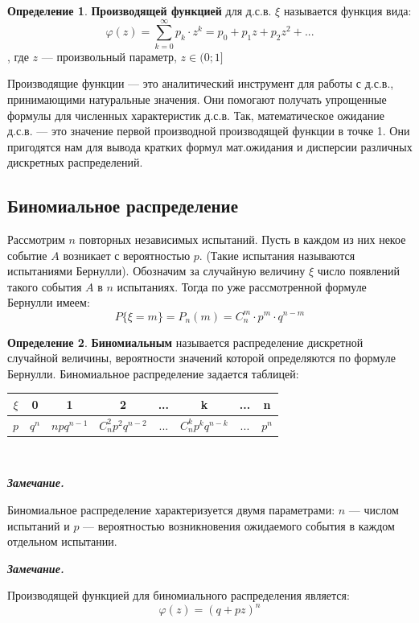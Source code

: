 \documentclass[12pt,a4paper]{article}
\theoremstyle{definition}
\newtheorem{definition}{Определение}[section]
\theoremstyle{definition}
\theoremstyle{remark}
\newenvironment{remark}{
  \par\noindent\textbf{\textit{Замечание.}}~
}{\par}
\theoremstyle{corollary}
\theoremstyle{bolditalic}
\begin{document}
\begin{definition}
    \textbf{Производящей функцией} для д.с.в. $\xi$ называется функция вида:
    \[
    \varphi(z)=\sum_{k=0}^{\infty}{p_k\cdot z^k}=p_0+p_1z+p_2z^2+...
    \]
    , где $z$ --- произвольный параметр, $z\in(0;1]$
\end{definition}

Производящие функции --- это аналитический инструмент для работы с д.с.в., принимающими натуральные значения. Они помогают получать упрощенные формулы для численных характеристик д.с.в. Так, математическое ожидание д.с.в. --- это значение первой производной производящей функции в точке 1. Они пригодятся нам для вывода кратких формул мат.ожидания и дисперсии различных дискретных распределений.

\subsection{Биномиальное распределение}

Рассмотрим $n$ повторных независимых испытаний. Пусть в каждом из них некое событие $A$ возникает с вероятностью $p$. (Такие испытания называются испытаниями Бернулли). Обозначим за случайную величину $\xi$ число появлений такого события $A$ в $n$ испытаниях. Тогда по уже рассмотренной формуле Бернулли имеем:
 \[
 P\{\xi=m\}=P_n(m)=C_n^m\cdot p^m\cdot q^{n-m}
 \]

 \begin{definition}
     \textbf{Биномиальным} называется распределение дискретной случайной величины, вероятности значений которой определяются по формуле Бернулли. Биномиальное распределение задается таблицей:\\
     
     \centering
    \begin{tabular}{|c|c|c|c|c|c|c|c|}
    \hline
    $\xi$ & 0 & 1 & 2 & ... & k & ... & n \\
    \hline
    $p$ & $q^n$ & $npq^{n-1}$ & $C_n^2p^2q^{n-2}$ & ... & $C_n^kp^kq^{n-k}$ & ... & $p^n$ \\
    \hline
    \end{tabular}\\
 \end{definition}

 \begin{remark}
     Биномиальное распределение характеризуется двумя параметрами: $n$ --- числом испытаний и $p$ --- вероятностью возникновения ожидаемого события в каждом отдельном испытании.
 \end{remark}
 \begin{remark}
     Производящей функцией для биномиального распределения является:
     \[
     \varphi(z)=(q+pz)^n
     \]
 \end{remark}
\end{document}
